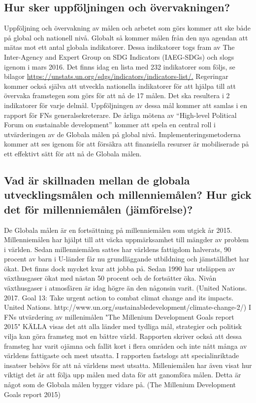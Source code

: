 \documentclass{report}
\begin{document}
\subsection{Hur sker uppföljningen och övervakningen?} 
Uppföljning och övervakning av målen och arbetet som görs kommer att ske både på global och nationell nivå. Globalt så kommer målen från den nya agendan att mätas mot ett antal globala indikatorer. Dessa indikatorer togs fram av The Inter-Agency and Expert Group on SDG Indicators (IAEG-SDGs) och slogs igenom i mars 2016. \cite{web2030agenda}
Det finns idag en lista med 232 indikatorer som följs, se bilagor \url {https://unstats.un.org/sdgs/indicators/indicators-list/.}
Regeringar kommer också själva att utveckla nationella indikatorer för att hjälpa till att övervaka framstegen som görs för att nå de 17 målen. Det ska resultera i 2 indikatorer för varje delmål. Uppföljningen av dessa mål kommer att samlas i en rapport för FNs generalsekreterare. De årliga mötena av  “High-level Political Forum on sustainable development” kommer att spela en central roll i utvärderingen av de Globala målen på global nivå. Implementeringsmetoderna kommer att ses igenom för att försäkra att finansiella resurser är mobiliserade på ett effektivt sätt för att nå de Globala målen.  \cite{web2030agenda}\\

\subsection{Vad är skillnaden mellan de globala utvecklingsmålen och millenniemålen? Hur gick det för millenniemålen (jämförelse)? } 
De Globala målen är en fortsättning på millenniemålen som utgick år 2015. Millenniemålen har hjälpt till att väcka uppmärksamhet till mängder av problem i världen. Sedan millenniemålen sattes har världens fattigdom halverats, 90 procent av barn i U-länder får nu grundläggande utbildning och jämställdhet har ökat. Det finns dock mycket kvar att jobba på. \cite{webEuropeanComission}
Sedan 1990 har utsläppen av växthusgaser ökat med nästan 50 procent och de fortsätter öka. Nivån växthusgaser i atmosfären är idag högre än den någonsin varit. (United Nations. 2017. Goal 13: Take urgent action to combat climat change and its impacts. United Nations.
http://www.un.org/sustainabledevelopment/climate-change-2/)
I FNs utvärdering av millenimålen "The Millenium Development Goals report 2015" KÄLLA visas det att alla länder med tydliga mål, strategier och politisk vilja kan göra framsteg mot en bättre värld. Rapporten skriver också att dessa framsteg har varit ojämna och fallit kort i flera områden och inte nått många av världens fattigaste och mest utsatta. I rapporten fastslogs att specialinriktade insatser behövs för att nå världens mest utsatta.  Milleniemålen har även visat hur viktigt det är att följa upp målen med data för att ganomföra målen. Detta är något som de Globala målen bygger vidare på. (The Millenium Development Goals report 2015)
\end{document}
